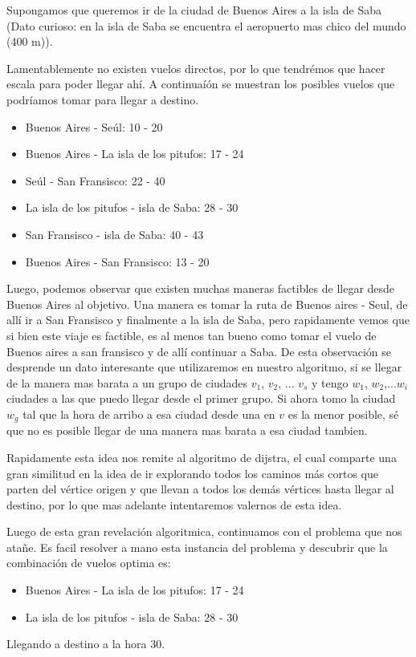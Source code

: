 Supongamos que queremos ir de la ciudad de Buenos Aires a la isla de Saba (Dato curioso: en la isla de Saba se encuentra el aeropuerto mas chico del mundo (400 m)).

Lamentablemente no existen vuelos directos, por lo que tendrémos que hacer escala para poder llegar ahí. A continuaíón se muestran los posibles vuelos que podríamos tomar para llegar a destino.

\begin{itemize}
\item Buenos Aires - Seúl: 10 - 20
\item Buenos Aires - La isla de los pitufos: 17 - 24
\item Seúl - San Fransisco: 22 - 40
\item La isla de los pitufos - isla de Saba: 28 - 30
\item San Fransisco - isla de Saba: 40 - 43
\item Buenos Aires - San Fransisco: 13 - 20
\end{itemize}

Luego, podemos observar que existen muchas maneras factibles de llegar desde Buenos Aires al objetivo. Una manera es tomar la ruta de Buenos aires - Seul, de allí ir a San Fransisco y finalmente a la isla de Saba, pero rapidamente vemos que si bien este viaje es factible, es al menos tan bueno como tomar el vuelo de Buenos aires a san fransisco y de allí continuar a Saba. De esta observación se desprende un dato interesante que utilizaremos en nuestro algoritmo, si se llegar de la manera mas barata a un grupo de ciudades $v_1$, $v_2$, ... $v_s$ y tengo $w_1$, $w_2$,...$w_i$ ciudades a las que puedo llegar desde el primer grupo. Si ahora tomo la ciudad $w_g$ tal que la hora de arribo a esa ciudad desde una en $v$ es la menor posible, sé que no es posible llegar de una manera mas barata a esa ciudad tambien.

Rapidamente esta idea nos remite al algoritmo de dijstra, el cual comparte una gran similitud en la idea de ir explorando todos los caminos más cortos que parten del vértice origen y que llevan a todos los demás vértices hasta llegar al destino, por lo que mas adelante intentaremos valernos de esta idea.

Luego de esta gran revelación algoritmica, continuamos con el problema que nos atañe. Es facil resolver a mano esta instancia del problema y descubrir que la combinación de vuelos optima es:
\begin{itemize}
\item Buenos Aires - La isla de los pitufos: 17 - 24
\item La isla de los pitufos - isla de Saba: 28 - 30
\end{itemize}
Llegando a destino a la hora $30$.

